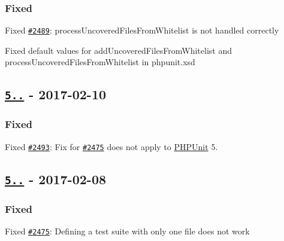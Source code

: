 \subsubsection*{Fixed}


\begin{DoxyItemize}
\item Fixed \href{https://github.com/sebastianbergmann/phpunit/issues/2489}{\tt \#2489}\+: {\ttfamily process\+Uncovered\+Files\+From\+Whitelist} is not handled correctly
\item Fixed default values for {\ttfamily add\+Uncovered\+Files\+From\+Whitelist} and {\ttfamily process\+Uncovered\+Files\+From\+Whitelist} in {\ttfamily phpunit.\+xsd}
\end{DoxyItemize}

\subsection*{\href{https://github.com/sebastianbergmann/phpunit/compare/5.7.12...5.7.13}{\tt 5..} -\/ 2017-\/02-\/10}

\subsubsection*{Fixed}


\begin{DoxyItemize}
\item Fixed \href{https://github.com/sebastianbergmann/phpunit/issues/2493}{\tt \#2493}\+: Fix for \href{https://github.com/sebastianbergmann/phpunit/pull/2475}{\tt \#2475} does not apply to \mbox{\hyperlink{namespace_p_h_p_unit}{P\+H\+P\+Unit}} 5.
\end{DoxyItemize}

\subsection*{\href{https://github.com/sebastianbergmann/phpunit/compare/5.7.11...5.7.12}{\tt 5..} -\/ 2017-\/02-\/08}

\subsubsection*{Fixed}


\begin{DoxyItemize}
\item Fixed \href{https://github.com/sebastianbergmann/phpunit/pull/2475}{\tt \#2475}\+: Defining a test suite with only one file does not work
\end{DoxyItemize}

